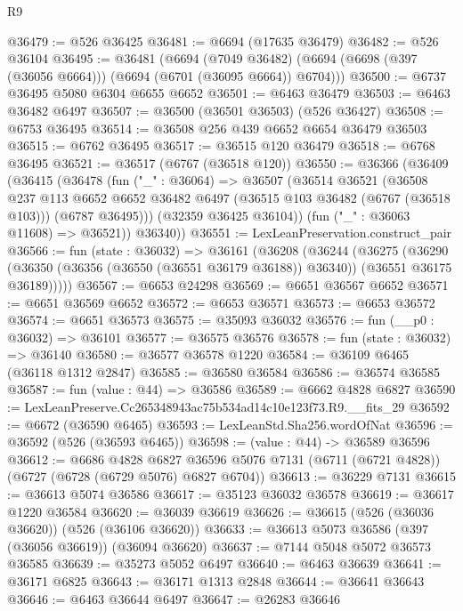 \begin{lexlean}{R9}
\begin{coremodule}
@36479 := @526 @36425
@36481 := @6694 (@17635 @36479)
@36482 := @526 @36104
@36495 := @36481
    (@6694
      (@7049 @36482)
      (@6694 (@6698 (@397 (@36056 @6664))) (@6694 (@6701 (@36095 @6664)) @6704)))
@36500 := @6737 @36495 @5080 @6304 @6655 @6652
@36501 := @6463 @36479
@36503 := @6463 @36482 @6497
@36507 := @36500 (@36501 @36503) (@526 @36427)
@36508 := @6753 @36495
@36514 := @36508 @256 @439 @6652 @6654 @36479 @36503
@36515 := @6762 @36495
@36517 := @36515 @120 @36479
@36518 := @6768 @36495
@36521 := @36517 (@6767 (@36518 @120))
@36550 := @36366
    (@36409
      (@36415
        (@36478
          (fun ("_" : @36064) =>
          @36507
            (@36514
              @36521
              (@36508
                @237
                @113
                @6652
                @6652
                @36482
                @6497
                (@36515 @103 @36482 (@6767 (@36518 @103)))
                (@6787 @36495)))
            (@32359 @36425 @36104))
          (fun ("_" : @36063 @11608) => @36521))
        @36340))
@36551 := LexLeanPreservation.construct_pair
@36566 := fun (state : @36032) =>
  @36161
    (@36208
      (@36244
        (@36275
          (@36290
            (@36350 (@36356 (@36550 (@36551 @36179 @36188)) @36340))
            (@36551 @36175 @36189)))))
@36567 := @6653 @24298
@36569 := @6651 @36567 @6652
@36571 := @6651 @36569 @6652
@36572 := @6653 @36571
@36573 := @6653 @36572
@36574 := @6651 @36573
@36575 := @35093 @36032
@36576 := fun (__p0 : @36032) => @36101
@36577 := @36575 @36576
@36578 := fun (state : @36032) => @36140
@36580 := @36577 @36578 @1220
@36584 := @36109 @6465 (@36118 @1312 @2847)
@36585 := @36580 @36584
@36586 := @36574 @36585
@36587 := fun (value : @44) => @36586
@36589 := @6662 @4828 @6827
@36590 := LexLeanPreserve.Cc265348943ac75b534ad14c10e123f73.R9.__fits_29
@36592 := @6672 (@36590 @6465)
@36593 := LexLeanStd.Sha256.wordOfNat
@36596 := @36592 (@526 (@36593 @6465))
@36598 := (value : @44) -> @36589 @36596
@36612 := @6686
    @4828
    @6827
    @36596
    @5076
    @7131
    (@6711 (@6721 @4828))
    (@6727 (@6728 (@6729 @5076) @6827 @6704))
@36613 := @36229 @7131
@36615 := @36613 @5074 @36586
@36617 := @35123 @36032 @36578
@36619 := @36617 @1220 @36584
@36620 := @36039 @36619
@36626 := @36615 (@526 (@36036 @36620)) (@526 (@36106 @36620))
@36633 := @36613 @5073 @36586 (@397 (@36056 @36619)) (@36094 @36620)
@36637 := @7144 @5048 @5072 @36573 @36585
@36639 := @35273 @5052 @6497
@36640 := @6463 @36639
@36641 := @36171 @6825
@36643 := @36171 @1313 @2848
@36644 := @36641 @36643
@36646 := @6463 @36644 @6497
@36647 := @26283 @36646

\end{coremodule}
\end{lexlean}
